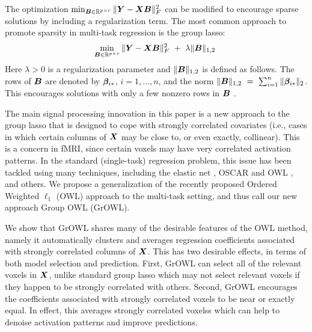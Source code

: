 The optimization $\min_{\boldsymbol{B}\in {\mathbb R}^{p\times r}} \|\boldsymbol{Y}-\boldsymbol{X}\boldsymbol{B}\|_F^2$ can be modified to encourage sparse solutions by including a regularization term.
The most common approach to promote sparsity in multi-task regression is the group lasso:
\begin{equation}\label{eqn.grouplasso}
 \min_{\bB\in \R^{p\times r}} \|\bY-\bX\bB\|_F^2 \ + \ \lambda \|\bB\|_{1,2}  \ 
 \end{equation}
Here $\lambda>0$ is a regularization parameter and $ \|\boldsymbol{B}\|_{1,2}$ is defined as follows.  The rows of $\boldsymbol{B}$ are denoted by $\boldsymbol{\beta}_{i {\ast}}$, $i=1,\dots,n$, and the norm $\|\boldsymbol{B}\|_{1,2} \ = \ \sum_{i=1}^n \|\boldsymbol{\beta}_{i {\ast}}\|_2$. This encourages solutions with only a few nonzero rows in $\boldsymbol{B}$ \cite{obo11,lounici,vandegeer}.  

The main signal processing innovation in this paper is a new approach to the group lasso that is designed to cope with strongly correlated covariates (i.e., cases in which certain columns of $\boldsymbol{X}$ may be close to, or even exactly, collinear).  This is a concern in fMRI, since certain voxels may have very correlated activation patterns.  In the standard (single-task) regression problem, this issue has been tackled using many techniques, including the elastic net \cite{EN}, OSCAR \cite{oscar} and OWL \cite{owl}, and others.  We propose a generalization of the recently proposed Ordered Weighted $\ell_1$ (OWL) approach to the multi-task setting, and thus call our new approach Group OWL (GrOWL).  

We show that GrOWL shares many of the desirable features of the OWL method, namely it automatically clusters and averages regression coefficients associated with strongly correlated columns of $\boldsymbol{X}$.  This has two desirable effects, in terms of both model selection and prediction.  First, GrOWL can select all of the relevant voxels in $\boldsymbol{X}$, unlike standard group lasso which may not select relevant voxels if they happen to be strongly correlated with others.  Second, GrOWL encourages the coefficients associated with strongly correlated voxels to be near or exactly equal.   In effect, this averages strongly correlated voxelss which can help to denoise activation patterns and improve predictions.  
